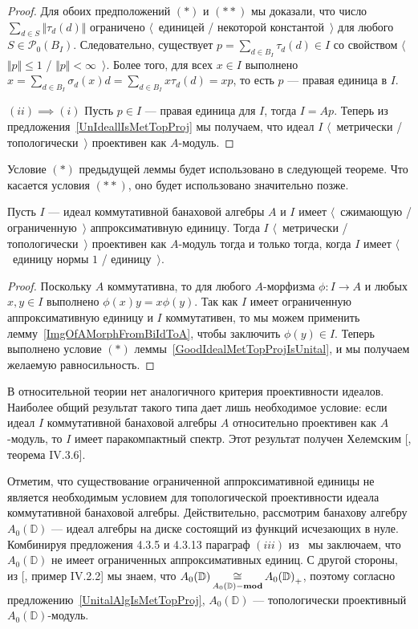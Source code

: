 \begin{proof}
Для обоих предположений $(*)$ и $(**)$ мы доказали, что число $\sum_{d\in
S}\Vert \tau_d(d)\Vert$ ограничено $\langle$~единицей / некоторой
константой~$\rangle$ для любого $S\in \mathcal{P}_0(B_I)$. Следовательно,
существует $p=\sum_{d\in B_I}\tau_d(d)\in I$ со свойством $\langle$~$\Vert
p\Vert\leq 1$ / $\Vert p\Vert< \infty$~$\rangle$. Более того, для всех $x\in I$
выполнено $x=\sum_{d\in B_I}\sigma_d(x)d=\sum_{d\in B_I}x\tau_d(d)=xp$, то есть
$p$ --- правая единица в $I$. 

$(ii) \implies(i)$ Пусть $p\in I$  --- правая единица для $I$, тогда $I=Ap$.
Теперь из предложения~\ref{UnIdeallIsMetTopProj} мы получаем, что идеал $I$
$\langle$~метрически / топологически~$\rangle$ проективен как $A$-модуль.
\end{proof}

Условие $(*)$ предыдущей леммы будет использовано в следующей теореме. Что
касается условия $(**)$, оно будет использовано значительно позже.

\begin{theorem}\label{GoodCommIdealMetTopProjIsUnital} Пусть $I$ --- идеал
коммутативной банаховой алгебры $A$ и $I$ имеет $\langle$~сжимающую /
ограниченную~$\rangle$ аппроксимативную единицу. Тогда $I$ $\langle$~метрически
/ топологически~$\rangle$ проективен как $A$-модуль тогда и только тогда, когда
$I$ имеет $\langle$~единицу нормы $1$ / единицу~$\rangle$.
\end{theorem} 
\begin{proof} Поскольку $A$ коммутативна, то для любого $A$-морфизма $\phi:I\to
A$ и любых $x,y\in I$ выполнено $\phi(x)y=x\phi(y)$. Так как $I$ имеет
ограниченную аппроксимативную единицу и $I$ коммутативен, то мы можем применить
лемму~\ref{ImgOfAMorphFromBiIdToA}, чтобы заключить $\phi(y)\in I$. Теперь
выполнено условие $(*)$ леммы~\ref{GoodIdealMetTopProjIsUnital}, и мы получаем
желаемую равносильность.
\end{proof}

В относительной теории нет аналогичного критерия проективности идеалов. Наиболее
общий результат такого типа дает лишь необходимое условие: если идеал $I$
коммутативной банаховой алгебры $A$ относительно проективен как $A$-модуль, то
$I$ имеет паракомпактный спектр. Этот результат получен Хелемским
[\cite{HelHomolBanTopAlg}, теорема IV.3.6]. 

Отметим, что существование ограниченной аппроксимативной единицы не является
необходимым условием для топологической проективности идеала коммутативной
банаховой алгебры. Действительно, рассмотрим банахову алгебру  $A_0(\mathbb{D})$
--- идеал алгебры на диске состоящий из функций исчезающих в нуле. Комбинируя
предложения 4.3.5 и 4.3.13 параграф $(iii)$ из~\cite{DalBanAlgAutCont} мы
заключаем, что $A_0(\mathbb{D})$ не имеет ограниченных аппроксимативных единиц.
С другой стороны, из [\cite{HelBanLocConvAlg}, пример IV.2.2] мы знаем, что
$A_0(\mathbb{D})\mathop{\mathbin{\cong}}\limits_{A_0(\mathbb{D})-\mathbf{mod}} {A_0(\mathbb{D})}_+$, поэтому
согласно предложению~\ref{UnitalAlgIsMetTopProj}, $A_0(\mathbb{D})$ ---
топологически проективный $A_0(\mathbb{D})$-модуль.

